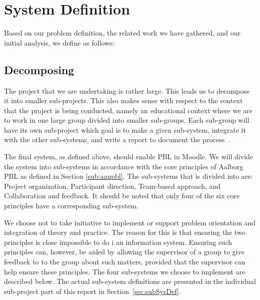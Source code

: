 \section{System Definition}
\label{sec:systemDef}
Based on our problem definition, the related work we have gathered, and our initial analysis, we define \system as follows:




\subsection{Decomposing \system}
\label{sub:decomposingSys}
The project that we are undertaking is rather large.
This leads us to decompose it into smaller sub-projects.
This also makes sense with respect to the context that the project is being conducted, namely an educational context where we are to work in one large group divided into smaller sub-groups.
Each sub-group will have its own sub-project which goal is to make a given sub-system, integrate it with the other sub-systems, and write a report to document the process~\cite{sw6studieordning}.

The final system, as defined above, should enable PBL in Moodle.
We will divide the system into sub-systems in accordance with the core principles of Aalborg PBL as defined in Section \ref{sub:aaupbl}.
The sub-systems that \system{} is divided into are:
Project organization,
Participant direction,
Team-based approach, and
Collaboration and feedback.
It should be noted that only four of the six core principles have a corresponding sub-system.


We choose not to take initiative to implement or support problem orientation and integration of theory and practice.
The reason for this is that ensuring the two principles is close impossible to do i an information system.
Ensuring such principles can, however, be aided by allowing the supervisor of a group to give feedback to to the group about such matters, provided that the supervisor can help ensure these principles.
The four sub-systems we choose to implement are described below.
The actual sub-system definitions are presented in the individual sub-project part of this report in Section~\ref{sec:subSysDef}. 

